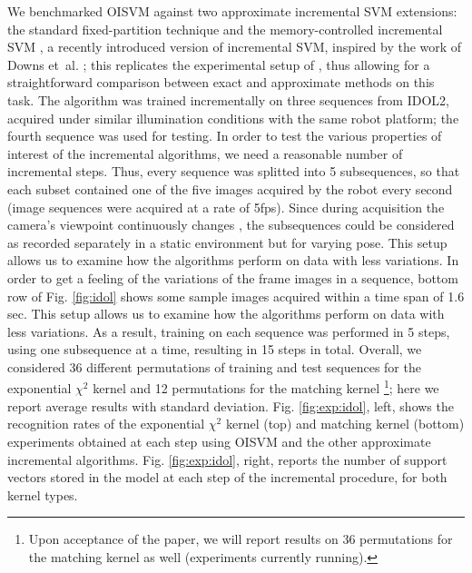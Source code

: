 We benchmarked  OISVM against two approximate incremental SVM extensions: the
standard fixed-partition technique \cite{syed99incremental} and the memory-controlled
incremental SVM \cite{luo:icra07}, a recently introduced version of incremental
SVM, inspired by the work of Downs et~al. \cite{DownsGM01}; this replicates
the experimental setup of \cite{luo:icra07}, thus allowing for
a straightforward comparison between  exact and approximate methods on this task. 
 The algorithm was
trained incrementally on three sequences from IDOL2, acquired under similar
illumination conditions with the same robot platform; the fourth sequence was
used for testing. In order to test the various properties of interest of the
incremental algorithms, we need a reasonable number of incremental steps.
Thus, every sequence was splitted into 5 subsequences, so that each subset 
contained one of the five images acquired by the robot every second (image
sequences were acquired at a rate of 5fps). Since during acquisition the camera's
viewpoint continuously changes \cite{luo:icra07}, the subsequences could be
considered as recorded separately in a static environment but for varying pose.
This setup allows us to examine how the algorithms perform on data with less
variations. In order to get a feeling of the variations of the frame images in a
sequence, bottom row of Fig. \ref{fig:idol} shows some sample images acquired
within a time span of 1.6 sec. This setup allows us to examine how the algorithms
perform on data with less variations. As a result, training on each sequence was
performed in 5 steps, using one subsequence at a time, resulting in 15 steps in 
total. Overall, we considered 36 different permutations of training and test
sequences for the exponential $\chi^2$ kernel and 12 permutations for the matching kernel 
\footnote{Upon acceptance of the paper, we will report results
on 36 permutations for the matching kernel as well (experiments currently running).}; 
here we report average results with standard deviation. 
Fig. \ref{fig:exp:idol}, left, shows the recognition rates of the exponential $\chi^2$ kernel (top)
and matching kernel (bottom) experiments obtained at each step using OISVM and the
other approximate incremental algorithms. Fig. \ref{fig:exp:idol}, right, reports
the number of support vectors stored in the model at each step of the incremental
procedure, for both kernel types.

